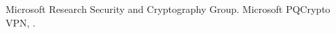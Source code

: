 \documentclass[a4paper,11pt]{article}
\begin{document}
\begin{otherlanguage}{english}
\begin{multicols}{2}
\begin{thebibliography}{1}
Microsoft Research Security and Cryptography Group.
\newblock Microsoft PQCrypto VPN,
.
  
\end{thebibliography}


\end{multicols}



\end{otherlanguage}
\end{document}
